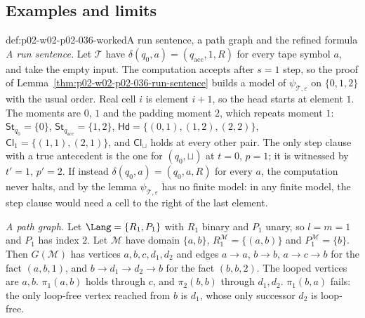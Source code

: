\subsection{Examples and limits}
\label{sec:p02-w02-p02-036-examples}

\begin{hbexample}{def:p02-w02-p02-036-worked}{A run sentence, a path graph and the refined formula}
\emph{A run sentence.}  Let \(\mathcal T\) have
\(\delta(q_0,a)=(q_{\mathrm{acc}},1,R)\) for every tape symbol \(a\), and take
the empty input.  The computation accepts after \(s=1\) step, so the proof of
Lemma~\ref{thm:p02-w02-p02-036-run-sentence} builds a model of
\(\psi_{\mathcal T,\varepsilon}\) on \(\{0,1,2\}\) with the usual order.
Real cell \(i\) is element \(i+1\), so the head starts at element \(1\).
The moments are \(0\), \(1\) and the padding moment \(2\), which repeats
moment \(1\):
\(\mathsf{St}_{q_0}=\{0\}\), \(\mathsf{St}_{q_{\mathrm{acc}}}=\{1,2\}\),
\(\mathsf{Hd}=\{(0,1),(1,2),(2,2)\}\), \(\mathsf{Cl}_1=\{(1,1),(2,1)\}\), and
\(\mathsf{Cl}_{\sqcup}\) holds at every other pair.  The only step clause with
a true antecedent is the one for \((q_0,\sqcup)\) at \(t=0\), \(p=1\); it is
witnessed by \(t'=1\), \(p'=2\).  If instead
\(\delta(q_0,a)=(q_0,a,R)\) for every \(a\), the computation never halts, and by
the lemma \(\psi_{\mathcal T,\varepsilon}\) has no finite model: in any finite
model, the step clause would need a cell to the right of the last element.

\emph{A path graph.}  Let \(\Lang=\{R_1,P_1\}\) with \(R_1\) binary and
\(P_1\) unary, so \(l=m=1\) and \(P_1\) has index \(2\).  Let \(\mathcal M\)
have domain \(\{a,b\}\), \(R_1^{\mathcal M}=\{(a,b)\}\) and
\(P_1^{\mathcal M}=\{b\}\).  Then \(G(\mathcal M)\) has vertices
\(a,b,c,d_1,d_2\) and edges \(a\to a\), \(b\to b\), \(a\to c\to b\) for the fact
\((a,b,1)\), and \(b\to d_1\to d_2\to b\) for the fact \((b,b,2)\).  The looped
vertices are \(a,b\).  \(\pi_1(a,b)\) holds through \(c\), and \(\pi_2(b,b)\)
through \(d_1,d_2\).  \(\pi_1(b,a)\) fails: the only loop-free vertex reached
from \(b\) is \(d_1\), whose only successor \(d_2\) is loop-free.


\end{hbexample}
